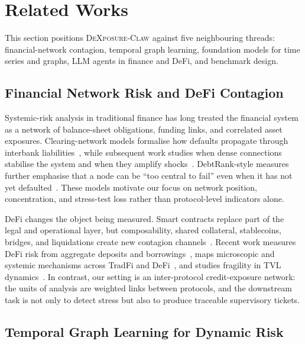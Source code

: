 \section{Related Works}

This section positions \textsc{DeXposure-Claw} against five neighbouring
threads: financial-network contagion, temporal graph learning, foundation
models for time series and graphs, LLM agents in finance and DeFi, and
benchmark design.

\subsection{Financial Network Risk and DeFi Contagion}

Systemic-risk analysis in traditional finance has long treated the financial
system as a network of balance-sheet obligations, funding links, and correlated
asset exposures. Clearing-network models formalise how defaults propagate
through interbank liabilities~\cite{EisenbergNoe2001}, while subsequent work
studies when dense connections stabilise the system and when they amplify
shocks~\cite{Acemoglu2015SystemicRisk,GlassermanYoung2016Contagion}.
DebtRank-style measures further emphasise that a node can be ``too central to
fail'' even when it has not yet defaulted~\cite{BattistonEtAl2012DebtRank}.
These models motivate our focus on network position, concentration, and
stress-test loss rather than protocol-level indicators alone.

DeFi changes the object being measured. Smart contracts replace part of the
legal and operational layer, but composability, shared collateral, stablecoins,
bridges, and liquidations create new contagion channels~\cite{Schar2021DeFi,
gogol2024sokdecentralizedfinancedefi,ESRB2025}. Recent work measures DeFi
risk from aggregate deposits and borrowings~\cite{BERTOMEU2024105321}, maps
microscopic and systemic mechanisms across TradFi and
DeFi~\cite{aufiero2025mappingmicroscopicsystemicrisks}, and studies fragility
in TVL dynamics~\cite{ZhangEtAl2026TVLDynamics}. In contrast, our setting is
an inter-protocol credit-exposure network: the units of analysis are weighted
links between protocols, and the downstream task is not only to detect stress
but also to produce traceable supervisory tickets.

\subsection{Temporal Graph Learning for Dynamic Risk}

